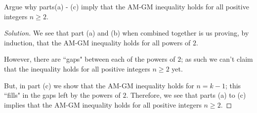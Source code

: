 \documentclass{article}
\newenvironment{solution}{\begin{proof}[Solution]}{\end{proof}}
\begin{document}
\begin{hw}
	Argue why parts(a) - (c) imply that the AM-GM inequality holds for all positive integers $n \geq 2$.
\end{hw}
\begin{solution}
	We see that part (a) and (b) when combined together is us proving, by induction, that the AM-GM inequality holds for all powers of $2$.
	
	However, there are ``gaps" between each of the powers of $2$; as such we can't claim that the inequality holds for all positive integers $n\geq 2$ yet. 
	
	But, in part (c) we show that the AM-GM inequality holds for $n=k-1$; this ``fills" in the gaps left by the powers of $2$. Therefore, we see that parts (a) to (c) implies that the AM-GM inequality holds for all positive integers $n \geq 2$.
\end{solution}
\newpage
\end{document}
